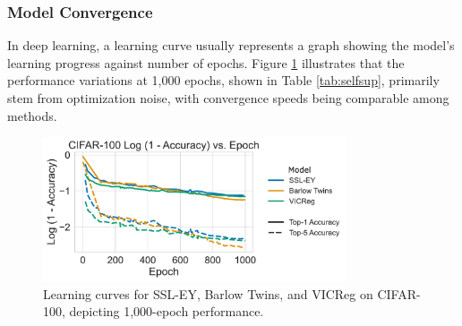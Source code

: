\begin{table}[H]
    \centering
    \caption{Comparing the performance of SSL methods on CIFAR-10 and CIFAR-100.}
    \label{tab:selfsup}
\end{table}

\subsubsection{Model Convergence} In deep learning, a learning curve usually represents a graph showing the model's learning progress against number of epochs.
Figure \ref{fig:ssl_learning_curve_cifar100_top5} illustrates that the performance variations at 1,000 epochs, shown in Table \ref{tab:selfsup}, primarily stem from optimization noise, with convergence speeds being comparable among methods.

\begin{figure}[H]
    \centering
    \includegraphics[width=0.8\textwidth]{figures/SSL/cifar100_learning_curve_log_error}
    \caption{Learning curves for SSL-EY, Barlow Twins, and VICReg on CIFAR-100, depicting 1,000-epoch performance.}
    \label{fig:ssl_learning_curve_cifar100_top5}
\end{figure}

